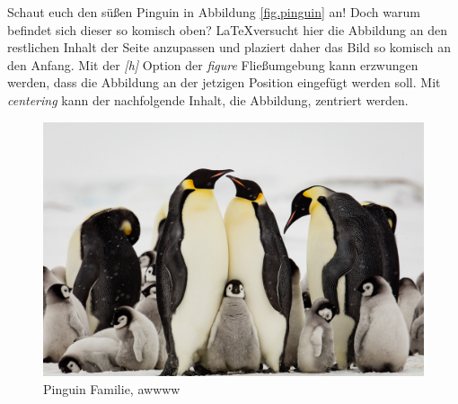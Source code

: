 Schaut euch den süßen Pinguin in Abbildung \ref{fig.pinguin} an! Doch warum befindet sich dieser so komisch oben? \LaTeX versucht hier die Abbildung an den restlichen Inhalt der Seite anzupassen und plaziert daher das Bild so komisch an den Anfang. Mit der \textit{[h]} Option der \textit{figure} Fließumgebung kann erzwungen werden, dass die Abbildung an der jetzigen Position eingefügt werden soll. Mit \textit{centering} kann der nachfolgende Inhalt, die Abbildung, zentriert werden.

\begin{figure}[h]
    \centering
    \includegraphics[scale=0.2]{bilder/penguin-family.jpg}
    \caption{Pinguin Familie, awwww}
    \label{fig.pinguinFamily}
\end{figure}

\newpage